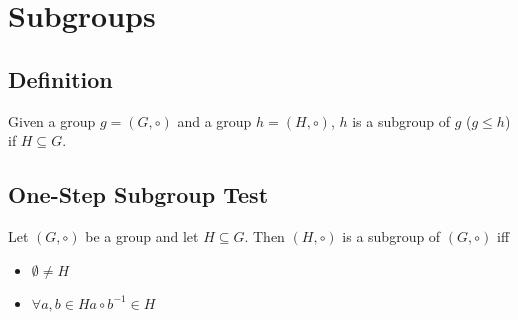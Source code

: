 \documentclass[a4paper]{article}
\begin{document}
\section{Subgroups}

\subsection{Definition}

Given a group \(g=(G, \circ)\) and a group \(h=(H, \circ)\), \(h\)
is a subgroup of \(g\) (\(g \leq h\)) if \(H \subseteq G\).

\subsection{One-Step Subgroup Test}

Let \((G, \circ)\) be a group and let \(H \subseteq G\).
Then \((H, \circ)\) is a subgroup of \((G, \circ)\) iff
\begin{itemize}
    \item \(\emptyset \neq H\)
    \item \(\forall a,b \in H a \circ b^{-1} \in H\)
\end{itemize}


\end{document}
